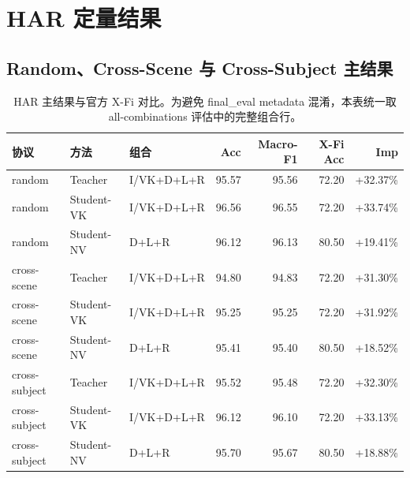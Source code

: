 \documentclass[UTF8,10pt]{ctexart}
\newcommand{\better}[1]{\textcolor{goodblue}{#1}}
\begin{document}
\section{HAR 定量结果}
\subsection{Random、Cross-Scene 与 Cross-Subject 主结果}
\begin{table}[H]\centering\scriptsize
\caption{HAR 主结果与官方 X-Fi 对比。为避免 final\_eval metadata 混淆，本表统一取 all-combinations 评估中的完整组合行。}
\begin{tabular}{lllrrrr}
\toprule
协议 & 方法 & 组合 & Acc & Macro-F1 & X-Fi Acc & Imp\\
\midrule
random & Teacher & I/VK+D+L+R & 95.57 & 95.56 & 72.20 & \better{+32.37\%}\\
random & Student-VK & I/VK+D+L+R & 96.56 & 96.55 & 72.20 & \better{+33.74\%}\\
random & Student-NV & D+L+R & 96.12 & 96.13 & 80.50 & \better{+19.41\%}\\
cross-scene & Teacher & I/VK+D+L+R & 94.80 & 94.83 & 72.20 & \better{+31.30\%}\\
cross-scene & Student-VK & I/VK+D+L+R & 95.25 & 95.25 & 72.20 & \better{+31.92\%}\\
cross-scene & Student-NV & D+L+R & 95.41 & 95.40 & 80.50 & \better{+18.52\%}\\
cross-subject & Teacher & I/VK+D+L+R & 95.52 & 95.48 & 72.20 & \better{+32.30\%}\\
cross-subject & Student-VK & I/VK+D+L+R & 96.12 & 96.10 & 72.20 & \better{+33.13\%}\\
cross-subject & Student-NV & D+L+R & 95.70 & 95.67 & 80.50 & \better{+18.88\%}\\
\bottomrule
\end{tabular}
\end{table}
\end{document}
